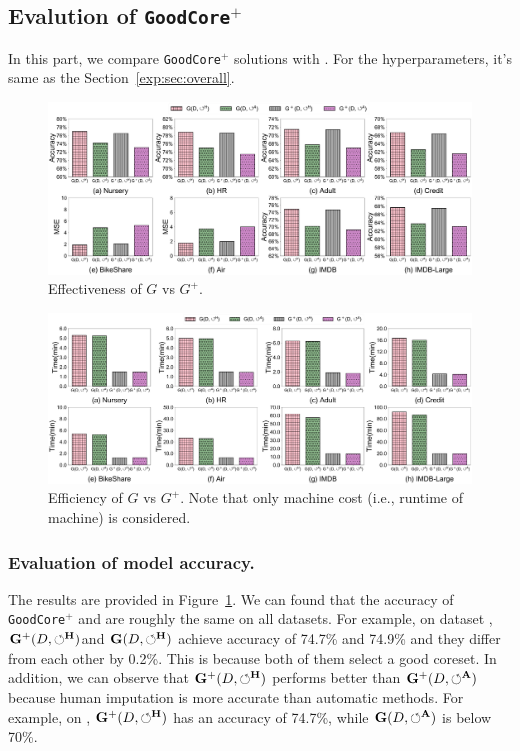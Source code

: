 \subsection{Evalution of \texttt{GoodCore}$^+$}
\label{exp:sec:G+}

In this part, we compare \texttt{GoodCore}$^+$ solutions with \ours. For the hyperparameters, it's same as the Section~\ref{exp:sec:overall}.

\begin{figure}
	\centering
	\includegraphics[width=\textwidth]{figs/effectiveness_new}
	\caption{Effectiveness of $G$ vs $G^+$.}
	\label{fig:effectiveness_new}
\end{figure}

\begin{figure}
	\centering
	\includegraphics[width=\textwidth]{figs/efficiency_new}
	\caption{Efficiency of $G$ vs $G^+$. Note that only machine cost (i.e., runtime of machine) is considered.}
	\label{fig:efficiency_new}
\end{figure}

\subsubsection{Evaluation of model accuracy.}
The results are provided in Figure~\ref{fig:effectiveness_new}. We can found that the accuracy of \texttt{GoodCore}$^+$ and \ours are roughly the same on all datasets. For example, on dataset \imdbl,  $\mathbf{G}^+(D,\circlearrowleft^\mathbf{H})$and $\mathbf{G}(D,\circlearrowleft^\mathbf{H})$ achieve accuracy of 74.7\% and 74.9\% and they differ from each other by 0.2\%. This is because both of them   select a good coreset. In addition, we can observe that $\mathbf{G}^+(D,\circlearrowleft^\mathbf{H})$ performs better than $\mathbf{G}^+(D,\circlearrowleft^\mathbf{A})$ because human imputation is more accurate than automatic methods. For example, on \imdbl,  $\mathbf{G}^+(D,\circlearrowleft^\mathbf{H})$ has an accuracy of 74.7\%, while $\mathbf{G}(D,\circlearrowleft^\mathbf{A})$ is below 70\%.

